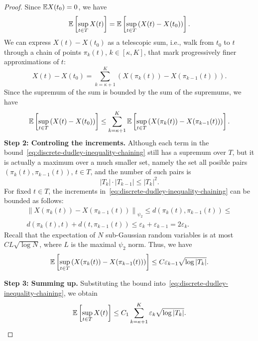 \begin{proof}
	Since \(\mathbb{E} X(t_{0})=0\), we have
	\begin{equation*}
		\mathbb{E}\left[\sup_{t\in T}X(t)\right]=\mathbb{E}\left[\sup_{t\in T}\left(X(t)-X(t_{0})\right)\right].
	\end{equation*}
	We can express \(X(t)-X(t_{0})\) as a telescopic sum, i.e., walk from \(t_{0}\) to \(t\) through a chain of points \(\pi_{k}(t)\), \(k\in[\kappa,K]\), that mark progressively finer approximations of \(t\):
	\begin{equation*}
		X(t)-X(t_{0})=\sum_{k=\kappa+1}^{K}\left(X(\pi_{k}(t))-X(\pi_{k-1}(t))\right).
	\end{equation*}
	Since the supremum of the sum is bounded by the sum of the supremums, we have
	\begin{equation}
		\label{eq:discrete-dudley-inequality-chaining}
		\mathbb{E}\left[\sup_{t\in T}\left(X(t)-X(t_{0})\right)\right]\leq\sum_{k=\kappa+1}^{K}\mathbb{E}\left[\sup_{t\in T}\left(X(\pi_{k}(t))-X(\pi_{k-1}(t))\right)\right].
	\end{equation}
	\textbf{Step 2: Controling the increments.} Although each term in the bound~\eqref{eq:discrete-dudley-inequality-chaining} still has a supremum over \(T\), but it is actually a maximum over a much smaller set, namely the set all posible pairs \((\pi_{k}(t),\pi_{k-1}(t))\), \(t\in T\), and the number of such pairs is
	\begin{equation*}
		|T_{k}|\cdot|T_{k-1}|\leq |T_{k}|^{2}.
	\end{equation*}
	For fixed \(t\in T\), the increments in~\eqref{eq:discrete-dudley-inequality-chaining} can be bounded as follows:
	\begin{multline*}
		\left\|X(\pi_{k}(t))-X(\pi_{k-1}(t))\right\|_{\psi_{2}}\leq d(\pi_{k}(t),\pi_{k-1}(t))\leq \\
		d(\pi_{k}(t),t)+d(t,\pi_{k-1}(t))\leq \varepsilon_{k}+\varepsilon_{k-1}=2\varepsilon_{k}.
	\end{multline*}
	Recall that the expectation of \(N\) sub-Gaussian random variables is at most \(CL\sqrt{\log N}\), where \(L\) is the maximal \(\psi_{2}\) norm. Thus, we have
	\begin{equation*}
		\mathbb{E}\left[\sup_{t\in T}\left(X(\pi_{k}(t))-X(\pi_{k-1}(t))\right)\right]\leq C\varepsilon_{k-1}\sqrt{\log |T_{k}|}.
	\end{equation*}

	\textbf{Step 3: Summing up.} Substituting the bound into~\eqref{eq:discrete-dudley-inequality-chaining}, we obtain
	\begin{equation*}
		\mathbb{E}\left[\sup_{t\in T}X(t)\right]\leq C_{1}\sum_{k=\kappa+1}^{K}\varepsilon_{k}\sqrt{\log |T_{k}|}.
	\end{equation*}


\end{proof}

